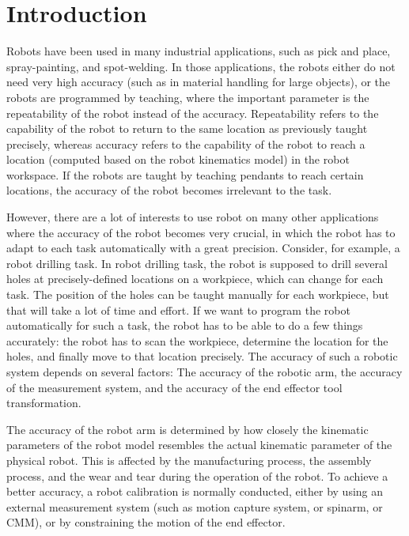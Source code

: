 \section{Introduction}
\label{sec:introduction}

Robots have been used in many industrial applications, such as pick and place, spray-painting, and spot-welding. In those applications, the robots either do not need very high accuracy (such as in material handling for large objects), or the robots are programmed by teaching, where the important parameter is the repeatability of the robot instead of the accuracy. Repeatability refers to the capability of the robot to return to the same location as previously taught precisely, whereas accuracy refers to the capability of the robot to reach a location (computed based on the robot kinematics model) in the robot workspace. If the robots are taught by teaching pendants to reach certain locations, the accuracy of the robot becomes irrelevant to the task. 

However, there are a lot of interests to use robot on many other applications where the accuracy of the robot becomes very crucial, in which the robot has to adapt to each task automatically with a great precision. Consider, for example, a robot drilling task. In robot drilling task, the robot is supposed to drill several holes at precisely-defined locations on a workpiece, which can change for each task. The position of the holes can be taught manually for each workpiece, but that will take a lot of time and effort. If we want to program the robot automatically for such a task, the robot has to be able to do a few things accurately: the robot has to scan the workpiece, determine the location for the holes, and finally
move to that location precisely. The accuracy of such a robotic system depends on several factors: The accuracy of the robotic arm, the accuracy of the measurement system, and the accuracy of the end effector tool transformation. 

The accuracy of the robot arm is determined by how closely the kinematic parameters of the robot model resembles the actual kinematic parameter of the physical robot. This is affected by the manufacturing process, the assembly process, and the wear and tear during the operation of the robot. To achieve a better accuracy, a robot calibration is normally conducted, either by using an external measurement system (such as motion capture system, or spinarm, or CMM), or by constraining the motion of the end effector. 

